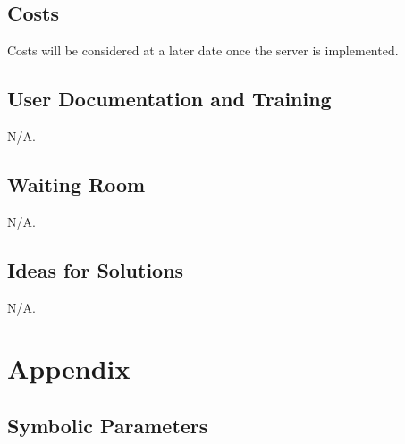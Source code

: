 \documentclass[12pt, titlepage]{article}
\begin{document}
\subsection{Costs}
Costs will be considered at a later date once the server is implemented.
\subsection{User Documentation and Training}
N/A.
\subsection{Waiting Room}
N/A.
\subsection{Ideas for Solutions}
N/A.




\newpage

\section{Appendix}

\subsection{Symbolic Parameters}
\end{document}
